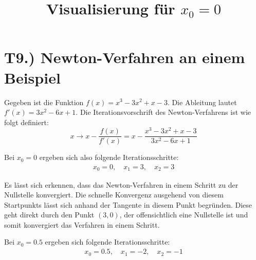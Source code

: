 \documentclass[11pt]{article}
\theoremstyle{plain}
\theoremstyle{definition}
\renewcommand{\a}{\"{a}}
\renewcommand{\u}{\"{u}}
\begin{document}
\section*{T9.) Newton-Verfahren an einem Beispiel}
Gegeben ist die Funktion $f(x)=x^3 - 3x^2 + x -3$. Die Ableitung lautet $f'(x)=3x^2 - 6x+1$. Die Iterationsvorschrift des Newton-Verfahrens ist wie folgt definiert:
\begin{equation}
x \rightarrow x - \dfrac{f(x)}{f'(x)} = x - \dfrac{x^3 - 3x^2 + x -3}{3x^2 - 6x+1}
\end{equation}

Bei $x_0=0$ ergeben sich also folgende Iterationsschritte:
\begin{align*}
x_0 = 0, \quad x_1 = 3, \quad x_2 = 3 
\end{align*}

\begin{figure}[!ht]
\centering
{}

\title{Visualisierung f\u r $x_0=0$}
\end{figure}

Es l\a sst sich erkennen, dass das Newton-Verfahren in einem Schritt zu der Nullstelle konvergiert. Die schnelle Konvergenz ausgehend von diesem Startpunkts l\a sst sich anhand der Tangente in diesem Punkt begr\u nden. Diese geht direkt durch den Punkt $(3,0)$, der offensichtlich eine Nullstelle ist und somit konvergiert das Verfahren in einem Schritt.\vspace{0.3cm}

Bei $x_0=0.5$ ergeben sich folgende Iterationsschritte:
\begin{align*}
x_0 = 0.5, \quad x_1 = -2, \quad x_2 = -1 
\end{align*}
\end{document}
